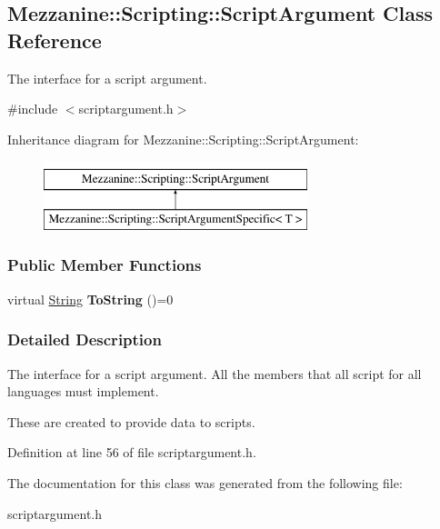\hypertarget{classMezzanine_1_1Scripting_1_1ScriptArgument}{
\subsection{Mezzanine::Scripting::ScriptArgument Class Reference}
\label{classMezzanine_1_1Scripting_1_1ScriptArgument}
}


The interface for a script argument.  




{\ttfamily \#include $<$scriptargument.h$>$}

Inheritance diagram for Mezzanine::Scripting::ScriptArgument:\begin{figure}[H]
\begin{center}
\leavevmode
\includegraphics[height=2.000000cm]{classMezzanine_1_1Scripting_1_1ScriptArgument}
\end{center}
\end{figure}
\subsubsection*{Public Member Functions}
\begin{DoxyCompactItemize}
\item 
\hypertarget{classMezzanine_1_1Scripting_1_1ScriptArgument_a3390632f9d61d53782b7aace79dab8dc}{
virtual \hyperlink{namespaceMezzanine_acf9fcc130e6ebf08e3d8491aebcf1c86}{String} {\bfseries ToString} ()=0}
\label{classMezzanine_1_1Scripting_1_1ScriptArgument_a3390632f9d61d53782b7aace79dab8dc}

\end{DoxyCompactItemize}


\subsubsection{Detailed Description}
The interface for a script argument. All the members that all script for all languages must implement. \par
 \par
 These are created to provide data to scripts. 

Definition at line 56 of file scriptargument.h.



The documentation for this class was generated from the following file:\begin{DoxyCompactItemize}
\item 
scriptargument.h\end{DoxyCompactItemize}
